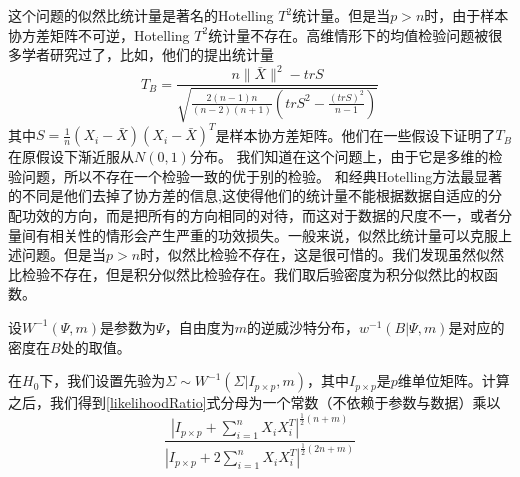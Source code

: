 \documentclass[review]{elsarticle}
\begin{document}
这个问题的似然比统计量是著名的Hotelling $T^2$统计量。但是当$p>n$时，由于样本协方差矩阵不可逆，Hotelling $T^2$统计量不存在。高维情形下的均值检验问题被很多学者研究过了，比如\cite{Bai1996Effect}，他们的提出统计量
\begin{equation}
    T_{B}=\frac{n\|\bar{X} \|^2-tr S}{
        \sqrt{\frac{2(n-1)n}{(n-2)(n+1)}(tr S^2-\frac{(tr S)^2}{n-1})}
    }
\end{equation}
其中$S=\frac{1}{n}(X_i-\bar{X})(X_i-\bar{X})^T$是样本协方差矩阵。他们在一些假设下证明了$T_B$在原假设下渐近服从$N(0,1)$分布。
我们知道在这个问题上，由于它是多维的检验问题，所以不存在一个检验一致的优于别的检验。
和经典Hotelling方法最显著的不同是他们去掉了协方差的信息,这使得他们的统计量不能根据数据自适应的分配功效的方向，而是把所有的方向相同的对待，而这对于数据的尺度不一，或者分量间有相关性的情形会产生严重的功效损失。一般来说，似然比统计量可以克服上述问题。但是当$p>n$时，似然比检验不存在，这是很可惜的。我们发现虽然似然比检验不存在，但是积分似然比检验存在。我们取后验密度为积分似然比的权函数。

设$W^{-1}(\Psi,m)$是参数为$\Psi$，自由度为$m$的逆威沙特分布，$w^{-1}(B|\Psi,m)$是对应的密度在$B$处的取值。

在$H_0$下，我们设置先验为$\Sigma\sim W^{-1}(\Sigma|I_{p\times p},m)$，其中$I_{p\times p}$是$p$维单位矩阵。计算之后，我们得到\eqref{likelihoodRatio}式分母为一个常数（不依赖于参数与数据）乘以
\begin{equation}\label{highDe}
    \frac{
        |I_{p\times p}+\sum^n_{i=1} X_i X_i^T|^{\frac{1}{2}(n+m)}
    }{
        |I_{p\times p}+2\sum^n_{i=1} X_i X_i^T|^{\frac{1}{2}(2n+m)}
    }
\end{equation}
\end{document}
